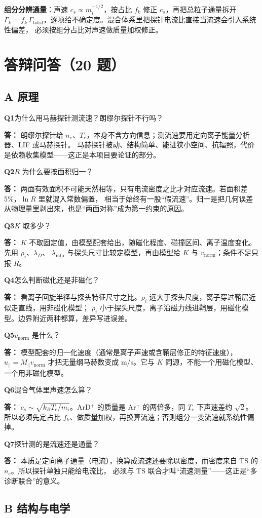\documentclass[11pt,a4paper]{ctexart}
\newcommand{\qt}[1]{\par\medskip\noindent\textbf{\color{accent}Q#1}\hspace{0.3em}}
\newcommand{\ans}{\par\noindent\hspace{1.1em}\textbf{答：}}
\begin{document}
\textbf{组分分辨通量}：声速 $c_s\propto m_i^{-1/2}$，按占比 $f_k$ 修正 $c_s$，再把总粒子通量拆开
$\Gamma_k=f_k\,\Gamma_{\mathrm{total}}$，逐项给不确定度。混合体系里把探针电流比直接当流速会引入系统性偏差，
必须按组分占比对声速做质量加权修正。

\clearpage
\section{答辩问答（20 题）}

\subsection*{A 原理}

\qt{1}为什么用马赫探针测流速？朗缪尔探针不行吗？\ans
朗缪尔探针给 $n_e$、$T_e$，本身不含方向信息；测流速要用定向离子能量分析器、LIF 或马赫探针。
马赫探针被动、结构简单、能进狭小空间、抗辐照，代价是依赖收集模型——这正是本项目要论证的部分。

\qt{2}$R$ 为什么要按面积归一？\ans
两面有效面积不可能天然相等，只有电流密度之比才对应流速。若面积差 5\%，$\ln R$ 里就混入常数偏置，
相当于始终有一股“假流速”。归一是把几何误差从物理量里剥出来，也是“两面对称”成为第一约束的原因。

\qt{3}$K$ 取多少？\ans
$K$ 不取固定值，由模型配套给出，随磁化程度、碰撞区间、离子温度变化。先用 $\rho_i$、$\lambda_D$、
$\lambda_{\mathrm{mfp}}$ 与探头尺寸比较定模型，再由模型给 $K$ 与 $v_{\mathrm{norm}}$；条件不足只报 $R$。

\qt{4}怎么判断磁化还是非磁化？\ans
看离子回旋半径与探头特征尺寸之比。$\rho_i$ 远大于探头尺度，离子穿过鞘层近似走直线，用非磁化模型；
$\rho_i$ 小于探头尺度，离子沿磁力线进鞘层，用磁化模型。边界附近两种都算，差异写进误差。

\qt{5}$v_{\mathrm{norm}}$ 是什么？\ans
模型配套的归一化速度（通常是离子声速或含鞘层修正的特征速度），$u_\parallel=M_\parallel v_{\mathrm{norm}}$
才把无量纲马赫数变成 m/s。它与 $K$ 同源，不能一个用磁化模型、一个用非磁化模型。

\qt{6}混合气体里声速怎么算？\ans
$c_s\sim\sqrt{k_BT_e/m_i}$。ArD$^+$ 的质量是 Ar$^+$ 的两倍多，同 $T_e$ 下声速差约 $\sqrt2$。
所以必须先定占比 $f_k$、做质量加权，再换算流速；否则组分一变流速就系统性偏掉。

\qt{7}探针测的是流速还是通量？\ans
本质是定向离子通量（电流），换算成流速还要除以密度，而密度来自 TS 的 $n_e$。所以探针单独只能给电流比，
必须与 TS 联合才叫“流速测量”——这正是“多诊断联合”的意义。

\subsection*{B 结构与电学}
\end{document}
